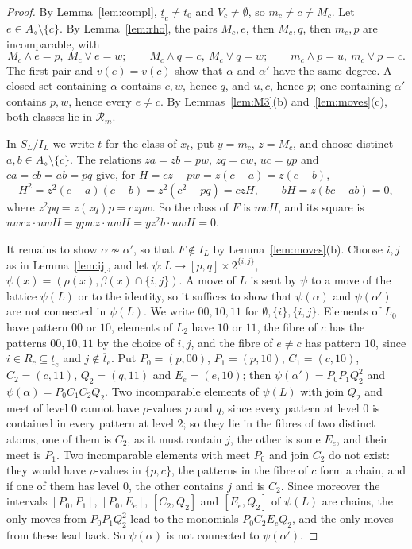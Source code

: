 \documentclass{amsart}
\theoremstyle{definition}
\newcommand{\dm}{\diamond}
\newcommand{\lt}{\underline{t}}
\newcommand{\ut}{\overline{t}}
\begin{document}
\begin{proof}
By Lemma~\ref{lem:compl}, $\lt_c\ne t_0$ and $V_c\ne\emptyset$, so $m_c\ne c\ne M_c$. Let $e\in A_\dm\setminus\{c\}$. By Lemma~\ref{lem:rho}, the pairs $M_c,e$, then $M_c,q$, then $m_c,p$ are incomparable, with
\[
M_c\wedge e=p,\ M_c\vee e=w;\qquad M_c\wedge q=c,\ M_c\vee q=w;\qquad m_c\wedge p=u,\ m_c\vee p=c.
\]
The first pair and $v(e)=v(c)$ show that $\alpha$ and $\alpha'$ have the same degree. A closed set containing $\alpha$ contains $c,w$, hence $q$, and $u,c$, hence $p$; one containing $\alpha'$ contains $p,w$, hence every $e\ne c$. By Lemmas~\ref{lem:M3}(b) and~\ref{lem:moves}(c), both classes lie in $\mathcal R_m$.

In $S_L/I_L$ we write $t$ for the class of $x_t$, put $y=m_c$, $z=M_c$, and choose distinct $a,b\in A_\dm\setminus\{c\}$. The relations $za=zb=pw$, $zq=cw$, $uc=yp$ and $ca=cb=ab=pq$ give, for $H=cz-pw=z(c-a)=z(c-b)$,
\[
H^2=z^2(c-a)(c-b)=z^2(c^2-pq)=czH,\qquad bH=z(bc-ab)=0,
\]
where $z^2pq=z(zq)p=czpw$. So the class of $F$ is $uwH$, and its square is $uwcz\cdot uwH=ypwz\cdot uwH=yz^2b\cdot uwH=0$.

It remains to show $\alpha\not\sim\alpha'$, so that $F\notin I_L$ by Lemma~\ref{lem:moves}(b). Choose $i,j$ as in Lemma~\ref{lem:ij}, and let $\psi:L\to[p,q]\times2^{\{i,j\}}$, $\psi(x)=(\rho(x),\beta(x)\cap\{i,j\})$. A move of $L$ is sent by $\psi$ to a move of the lattice $\psi(L)$ or to the identity, so it suffices to show that $\psi(\alpha)$ and $\psi(\alpha')$ are not connected in $\psi(L)$. We write $00,10,11$ for $\emptyset,\{i\},\{i,j\}$. Elements of $L_0$ have pattern $00$ or $10$, elements of $L_2$ have $10$ or $11$, the fibre of $c$ has the patterns $00,10,11$ by the choice of $i,j$, and the fibre of $e\ne c$ has pattern $10$, since $i\in R_c\subseteq\lt_e$ and $j\notin\ut_e$. Put $P_0=(p,00)$, $P_1=(p,10)$, $C_1=(c,10)$, $C_2=(c,11)$, $Q_2=(q,11)$ and $E_e=(e,10)$; then $\psi(\alpha')=P_0P_1Q_2^2$ and $\psi(\alpha)=P_0C_1C_2Q_2$. Two incomparable elements of $\psi(L)$ with join $Q_2$ and meet of level $0$ cannot have $\rho$-values $p$ and $q$, since every pattern at level $0$ is contained in every pattern at level $2$; so they lie in the fibres of two distinct atoms, one of them is $C_2$, as it must contain $j$, the other is some $E_e$, and their meet is $P_1$. Two incomparable elements with meet $P_0$ and join $C_2$ do not exist: they would have $\rho$-values in $\{p,c\}$, the patterns in the fibre of $c$ form a chain, and if one of them has level $0$, the other contains $j$ and is $C_2$. Since moreover the intervals $[P_0,P_1]$, $[P_0,E_e]$, $[C_2,Q_2]$ and $[E_e,Q_2]$ of $\psi(L)$ are chains, the only moves from $P_0P_1Q_2^2$ lead to the monomials $P_0C_2E_eQ_2$, and the only moves from these lead back. So $\psi(\alpha)$ is not connected to $\psi(\alpha')$.
\end{proof}
\end{document}
